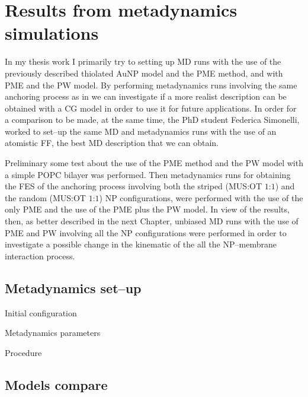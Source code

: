 \chapter{Results from metadynamics simulations}

In my thesis work I primarily try to setting up \ac{MD} runs with the use of the previously described thiolated \ac{AuNP} model and the \ac{PME} method, and with \ac{PME} and the \ac{PW} model. By performing metadynamics runs involving the same anchoring process as in \cite{ourPaper} we can investigate if a more realist description can be obtained with a \ac{CG} model in order to use it for future applications. In order for a comparison to be made, at the same time, the PhD student Federica Simonelli, worked to set--up the same \ac{MD} and metadynamics runs with the use of an atomistic \ac{FF}, the best \ac{MD} description that we can obtain.

Preliminary some test about the use of the \ac{PME} method and the \ac{PW} model with a simple \ac{POPC} bilayer was performed. Then metadynamics runs for obtaining the \ac{FES} of the anchoring process involving both the striped (\ac{MUS}:\ac{OT} $1$:$1$) and the random (\ac{MUS}:\ac{OT} $1$:$1$) \ac{NP} configurations, were performed with the use of the only \ac{PME} and the use of the \ac{PME} plus the \ac{PW} model. In view of the results, then, as better described in the next Chapter, unbiased \ac{MD} runs with the use of \ac{PME} and \ac{PW} involving all the \ac{NP} configurations were performed in order to investigate a possible change in the kinematic of the all the \ac{NP}--membrane interaction process.



\section{Metadynamics set--up}


Initial configuration

Metadynamics parameters

Procedure

\section{Models compare}

